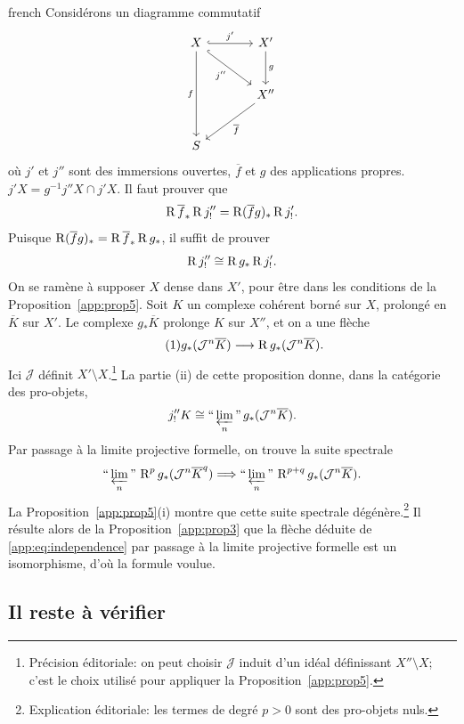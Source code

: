 \begin{hyphenrules}{french}
Consid\'erons un diagramme commutatif
\[
\begin{tikzcd}[row sep=large,column sep=large]
X \ar[r,hook,"j'"] \ar[dr,hook,"j''"'] \ar[dd,"f"']
 & X' \ar[d,"g"] \\
 & X'' \ar[dl,"\overline f"] \\
S
\end{tikzcd}
\]
o\`u $j'$ et $j''$ sont des immersions ouvertes, $\overline f$ et $g$
des applications propres. $j'X=g^{-1}j''X\cap j'X$. Il faut prouver que
\[
\operatorname{R}\overline f_*\operatorname{R} j''_!
=\operatorname{R}(\overline f g)_*\operatorname{R} j'_!.
\]
Puisque $\operatorname{R}(\overline f g)_*=\operatorname{R}\overline f_*\operatorname{R} g_*$, il suffit de prouver
\[
\operatorname{R} j''_!\cong\operatorname{R} g_*\operatorname{R} j'_!.
\]
On se ram\`ene \`a supposer $X$ dense dans $X'$, pour \^etre dans les
conditions de la Proposition~\ref{app:prop5}.
Soit $K$ un complexe coh\'erent born\'e sur $X$, prolong\'e en $\overline K$
sur $X'$. Le complexe $g_*\overline K$ prolonge $K$ sur $X''$, et on a une fl\`eche
\begin{equation}\tag{1}\label{app:eq:independence}
g_*(\mathcal J^n\overline K)\longrightarrow\operatorname{R} g_*(\mathcal J^n\overline K).
\end{equation}
Ici $\mathcal J$ d\'efinit $X'\setminus X$.\footnote{Pr\'ecision \'editoriale: on peut choisir $\mathcal J$ induit d'un id\'eal d\'efinissant $X''\setminus X$; c'est le choix utilis\'e pour appliquer la Proposition~\ref{app:prop5}.}
La partie (ii) de cette proposition donne, dans la cat\'egorie des pro-objets,
\[
j''_!K\cong\text{``}\varprojlim_n\text{''}\,g_*(\mathcal J^n\overline K).
\]
Par passage \`a la limite projective formelle, on trouve la suite spectrale
\[
\text{``}\varprojlim_n\text{''}\,\operatorname{R}^p g_*(\mathcal J^n\overline K^q)
\Longrightarrow
\text{``}\varprojlim_n\text{''}\,\operatorname{R}^{p+q}g_*(\mathcal J^n\overline K).
\]
La Proposition~\ref{app:prop5}(i) montre que cette suite spectrale d\'eg\'en\`ere.\footnote{Explication \'editoriale: les termes de degr\'e $p>0$ sont des pro-objets nuls.} Il r\'esulte alors de la
Proposition~\ref{app:prop3} que la fl\`eche d\'eduite de
\eqref{app:eq:independence} par passage \`a la limite projective formelle
est un isomorphisme, d'o\`u la formule voulue.

\subsection*{Il reste \`a v\'erifier}


\end{hyphenrules}
